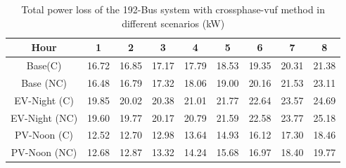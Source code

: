 \documentclass[journal]{IEEEtran}
\begin{document}
\begin{center}
\begin{table}
\caption{Total power loss of the 192-Bus system with crossphase-vuf method in different scenarios (kW)}
\label{Table8}
\centering
\setlength{\tabcolsep}{4pt}
\begin{tabular}{c|c|c|c|c|c|c|c|c}
    \hline\hline
    Hour & 1 & 2 & 3 & 4 & 5 & 6 & 7 & 8\\ \hline
    Base(C) & 16.72 & 16.85 & 17.17 & 17.79 & 18.53 & 19.35 & 20.31 & 21.38\\
    \hline
    \multirow{2}{3.5em}{Base (NC)} & \multirow{2}{*}{16.48} & \multirow{2}{*}{16.79} & \multirow{2}{*}{17.32} & \multirow{2}{*}{18.06} & \multirow{2}{*}{19.00} & \multirow{2}{*}{20.16} & \multirow{2}{*}{21.53} & \multirow{2}{*}{23.11}\\ & & & & & & & &\\
    \hline
   \multirow{2}{3.9em}{EV-Night (C)} & \multirow{2}{*}{19.85} & \multirow{2}{*}{20.02} & \multirow{2}{*}{20.38} & \multirow{2}{*}{21.01} & \multirow{2}{*}{21.77} & \multirow{2}{*}{22.64} & \multirow{2}{*}{23.57} & \multirow{2}{*}{24.69}\\ & & & & & & & &\\
    \hline
    \multirow{2}{3.9em}{EV-Night (NC)} & \multirow{2}{*}{19.60} & \multirow{2}{*}{19.77} & \multirow{2}{*}{20.17} & \multirow{2}{*}{20.79} & \multirow{2}{*}{21.59} & \multirow{2}{*}{22.58} & \multirow{2}{*}{23.77} & \multirow{2}{*}{25.18}\\ & & & & & & & &\\
    \hline
    \multirow{2}{3.9em}{PV-Noon (C)} & \multirow{2}{*}{12.52} & \multirow{2}{*}{12.70} & \multirow{2}{*}{12.98} & \multirow{2}{*}{13.64} & \multirow{2}{*}{14.93} & \multirow{2}{*}{16.12} & \multirow{2}{*}{17.30} & \multirow{2}{*}{18.46}\\ & & & & & & & &\\
    \hline
    \multirow{2}{3.9em}{PV-Noon (NC)} & \multirow{2}{*}{12.68} & \multirow{2}{*}{12.87} & \multirow{2}{*}{13.32} & \multirow{2}{*}{14.24} & \multirow{2}{*}{15.68} & \multirow{2}{*}{16.97} & \multirow{2}{*}{18.40} & \multirow{2}{*}{19.77}\\ & & & & & & & &\\
    \hline\hline
    \end{tabular}

\end{table}
\end{center}


\end{document}
